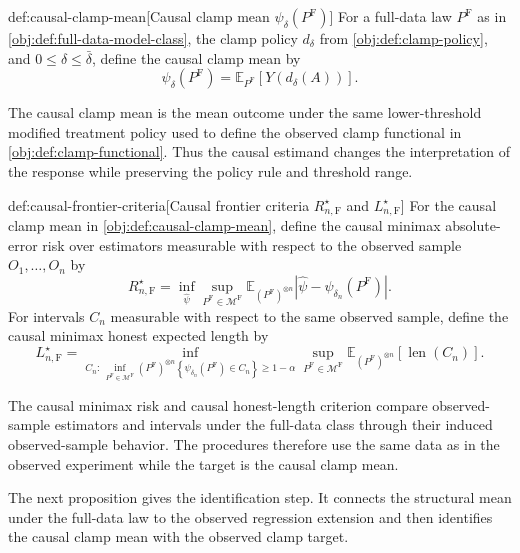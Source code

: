 \begin{definitionv}{def:causal-clamp-mean}[Causal clamp mean \(\psi_\delta(P^{\mathrm F})\)]
For a full-data law \(P^{\mathrm F}\) as in \cref{obj:def:full-data-model-class}, the clamp policy \(d_\delta\) from \cref{obj:def:clamp-policy}, and \(0\leq\delta\leq\bar\delta\), define the causal clamp mean by
\[
\psi_\delta(P^{\mathrm F})
=
\mathbb E_{P^{\mathrm F}}\!\left[Y(d_\delta(A))\right].
\]
\end{definitionv}

The causal clamp mean  is the mean outcome under the same lower-threshold modified treatment policy used to define the observed clamp functional in \cref{obj:def:clamp-functional}. Thus the causal estimand changes the interpretation of the response while preserving the policy rule and threshold range.

\begin{definitionv}{def:causal-frontier-criteria}[Causal frontier criteria \(R_{n,\mathrm F}^\star\) and \(L_{n,\mathrm F}^\star\)]
For the causal clamp mean in \cref{obj:def:causal-clamp-mean}, define the causal minimax absolute-error risk over estimators measurable with respect to the observed sample \(O_1,\ldots,O_n\) by
\[
 R_{n,\mathrm F}^\star
 =
 \inf_{\widehat\psi}\sup_{P^{\mathrm F}\in\mathcal M^{\mathrm F}}
 \mathbb E_{(P^{\mathrm F})^{\otimes n}}
 \left|\widehat\psi-\psi_{\delta_n}(P^{\mathrm F})\right|.
\]
For intervals \(C_n\) measurable with respect to the same observed sample, define the causal minimax honest expected length by
\[
 L_{n,\mathrm F}^\star
 =
 \inf_{C_n:\,\inf_{P^{\mathrm F}\in\mathcal M^{\mathrm F}}
 (P^{\mathrm F})^{\otimes n}
 \left\{\psi_{\delta_n}(P^{\mathrm F})\in C_n\right\}\geq1-\alpha}
 \sup_{P^{\mathrm F}\in\mathcal M^{\mathrm F}}
 \mathbb E_{(P^{\mathrm F})^{\otimes n}}
 \left[\operatorname{len}(C_n)\right].
\]
\end{definitionv}

The causal minimax risk  and causal honest-length criterion  compare observed-sample estimators and intervals under the full-data class through their induced observed-sample behavior. The procedures therefore use the same data as in the observed experiment while the target is the causal clamp mean.

The next proposition gives the identification step. It connects the structural mean under the full-data law to the observed regression extension and then identifies the causal clamp mean with the observed clamp target.

